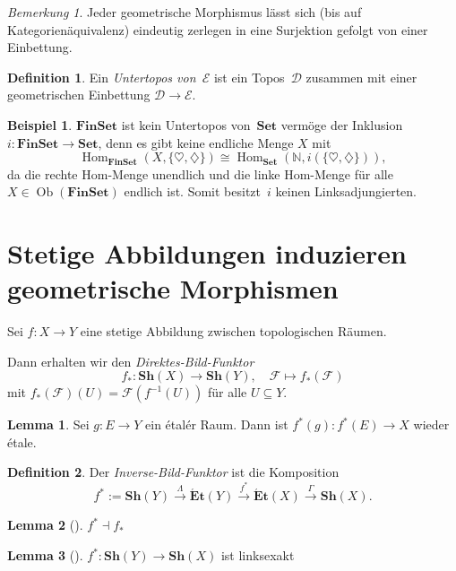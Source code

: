 \documentclass{article}
\theoremstyle{definition}
\newtheorem*{defn}{Definition}
\newtheorem*{lem}{Lemma}
\newtheorem*{bsp}{Beispiel}
\theoremstyle{remark}
\newtheorem*{bem}{Bemerkung}
\newcommand{\coloneqq}{:=} %
\newcommand{\?}{\,{:}\,}
\renewcommand{\_}{\mathpunct{.}\,}
\newcommand{\N}{\mathbb{N}} %
\DeclareMathOperator{\Ob}{Ob} %
\DeclareMathOperator{\Hom}{Hom} %
\newcommand{\ladj}{\dashv} %
\newcommand{\SetC}{\mathbf{Set}} %
\newcommand{\FinSetC}{\mathbf{FinSet}} %
\newcommand{\Sh}{\mathbf{Sh}} %
\newcommand{\Etale}{\mathbf{\acute{E}t}} %
\newcommand{\Dat}{\mathcal{D}} %
\newcommand{\Eat}{\mathcal{E}} %
\newcommand{\Fais}{\mathcal{F}} %
\begin{document}
\begin{bem}
  Jeder geometrische Morphismus lässt sich (bis auf Kategorienäquivalenz) eindeutig zerlegen in eine Surjektion gefolgt von einer Einbettung.
\end{bem}

\begin{defn}
  Ein \emph{Untertopos von~$\Eat$} ist ein Topos~$\Dat$ zusammen mit einer geometrischen Einbettung $\Dat \to \Eat$.
\end{defn}

\begin{bsp}
  $\FinSetC$ ist kein Untertopos von~$\SetC$ vermöge der Inklusion $i : \FinSetC \to \SetC$, denn es gibt keine endliche Menge $X$ mit
  \[ \Hom_\FinSetC(X, \{ \heartsuit, \diamondsuit \}) \cong \Hom_\SetC(\N, i(\{ \heartsuit, \diamondsuit \})), \]
  da die rechte Hom-Menge unendlich und die linke Hom-Menge für alle $X \in \Ob(\FinSetC)$ endlich ist.
  Somit besitzt~$i$ keinen Linksadjungierten.
\end{bsp}

\section{Stetige Abbildungen induzieren geometrische Morphismen}

Sei $f : X \to Y$ eine stetige Abbildung zwischen topologischen Räumen.

Dann erhalten wir den \emph{Direktes-Bild-Funktor}
\[
  f_* : \Sh(X) \to \Sh(Y), \quad
  \Fais \mapsto f_*(\Fais)
\]
mit $f_*(\Fais)(U) = \Fais(f^{-1}(U))$ für alle $U \subseteq Y$.

\begin{lem}
  Sei $g : E \to Y$ ein étalér Raum.
  Dann ist $f^*(g) : f^*(E) \to X$ wieder étale.
\end{lem}

\begin{defn}
  Der \emph{Inverse-Bild-Funktor} ist die Komposition
  \[
    f^* \coloneqq \Sh(Y) \xrightarrow{\Lambda} \Etale(Y) \xrightarrow{f^*} \Etale(X) \xrightarrow{\Gamma} \Sh(X).
  \]
\end{defn}

\begin{lem}[{\cite[II.9.2]{sigal}}]
  $f^* \ladj f_*$  
\end{lem}

\begin{lem}[{\cite[II.9.3]{sigal}}]
  $f^* : \Sh(Y) \to \Sh(X)$ ist linksexakt
\end{lem}
\end{document}
